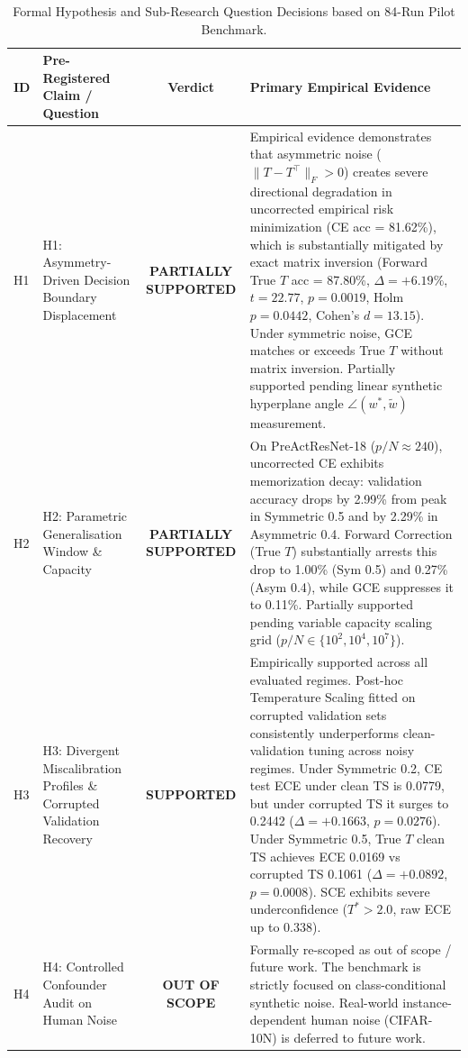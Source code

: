 \begin{table}[t]
\centering
\caption{Formal Hypothesis and Sub-Research Question Decisions based on 84-Run Pilot Benchmark.}
\label{tab:hypotheses}
\footnotesize
\setlength{\tabcolsep}{4pt}
\begin{tabular}{lp{4.2cm}cp{7.5cm}}
\hline
\textbf{ID} & \textbf{Pre-Registered Claim / Question} & \textbf{Verdict} & \textbf{Primary Empirical Evidence} \\
\hline
H1 & H1: Asymmetry-Driven Decision Boundary Displacement & \textbf{PARTIALLY SUPPORTED} & Empirical evidence demonstrates that asymmetric noise ($\|T - T^\top\|_F > 0$) creates severe directional degradation in uncorrected empirical risk minimization (CE acc = 81.62\%), which is substantially mitigated by exact matrix inversion (Forward True $T$ acc = 87.80\%, $\Delta = +6.19\%$, $t = 22.77$, $p = 0.0019$, Holm $p = 0.0442$, Cohen's $d = 13.15$). Under symmetric noise, GCE matches or exceeds True $T$ without matrix inversion. Partially supported pending linear synthetic hyperplane angle $\angle(w^*, \tilde{w})$ measurement. \\
H2 & H2: Parametric Generalisation Window \& Capacity & \textbf{PARTIALLY SUPPORTED} & On PreActResNet-18 ($p/N \approx 240$), uncorrected CE exhibits memorization decay: validation accuracy drops by 2.99\% from peak in Symmetric 0.5 and by 2.29\% in Asymmetric 0.4. Forward Correction (True $T$) substantially arrests this drop to 1.00\% (Sym 0.5) and 0.27\% (Asym 0.4), while GCE suppresses it to 0.11\%. Partially supported pending variable capacity scaling grid ($p/N \in \{10^2, 10^4, 10^7\}$). \\
H3 & H3: Divergent Miscalibration Profiles \& Corrupted Validation Recovery & \textbf{SUPPORTED} & Empirically supported across all evaluated regimes. Post-hoc Temperature Scaling fitted on corrupted validation sets consistently underperforms clean-validation tuning across noisy regimes. Under Symmetric 0.2, CE test ECE under clean TS is 0.0779, but under corrupted TS it surges to 0.2442 ($\Delta = +0.1663$, $p = 0.0276$). Under Symmetric 0.5, True $T$ clean TS achieves ECE 0.0169 vs corrupted TS 0.1061 ($\Delta = +0.0892$, $p = 0.0008$). SCE exhibits severe underconfidence ($T^* > 2.0$, raw ECE up to 0.338). \\
H4 & H4: Controlled Confounder Audit on Human Noise & \textbf{OUT OF SCOPE} & Formally re-scoped as out of scope / future work. The benchmark is strictly focused on class-conditional synthetic noise. Real-world instance-dependent human noise (CIFAR-10N) is deferred to future work. \\

\end{tabular}
\end{table}
